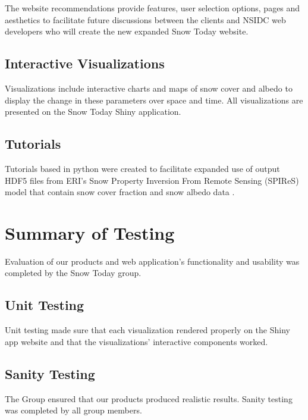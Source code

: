 \documentclass[
]{book}
\begin{document}
The website recommendations provide features, user selection options, pages and aesthetics to facilitate future discussions between the clients and NSIDC web developers who will create the new expanded Snow Today website.

\hypertarget{interactive-visualizations}{%
\section{Interactive Visualizations}\label{interactive-visualizations}}

Visualizations include interactive charts and maps of snow cover and albedo to display the change in these parameters over space and time. All visualizations are presented on the Snow Today Shiny application.

\hypertarget{tutorials}{%
\section{Tutorials}\label{tutorials}}

Tutorials based in python were created to facilitate expanded use of output HDF5 files from ERI's Snow Property Inversion From Remote Sensing (SPIReS) model that contain snow cover fraction and snow albedo data \citep{spires2021}.

\hypertarget{testing}{%
\chapter{Summary of Testing}\label{testing}}

Evaluation of our products and web application's functionality and usability was completed by the Snow Today group.

\hypertarget{unit-testing}{%
\section{Unit Testing}\label{unit-testing}}

Unit testing made sure that each visualization rendered properly on the Shiny app website and that the visualizations' interactive components worked.

\hypertarget{sanity-testing}{%
\section{Sanity Testing}\label{sanity-testing}}

The Group ensured that our products produced realistic results. Sanity testing was completed by all group members.
\end{document}

